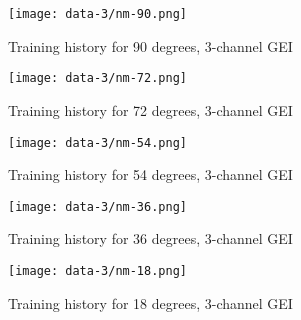 
\begin{figure}[ht]
    \centering
    \texttt{[image: data-3/nm-90.png]}
    \caption{Training history for 90 degrees, 3-channel GEI}
    \label{fig:nm-90-3}
\end{figure}

\begin{figure}[ht]
    \centering
    \texttt{[image: data-3/nm-72.png]}
    \caption{Training history for 72 degrees, 3-channel GEI}
    \label{fig:nm-72-3}
\end{figure}

\begin{figure}[ht]
    \centering
    \texttt{[image: data-3/nm-54.png]}
    \caption{Training history for 54 degrees, 3-channel GEI}
    \label{fig:nm-54-3}
\end{figure}

\begin{figure}[ht]
    \centering
    \texttt{[image: data-3/nm-36.png]}
    \caption{Training history for 36 degrees, 3-channel GEI}
    \label{fig:nm-36-3}
\end{figure}

\begin{figure}[ht]
    \centering
    \texttt{[image: data-3/nm-18.png]}
    \caption{Training history for 18 degrees, 3-channel GEI}
    \label{fig:nm-18-3}
\end{figure}

